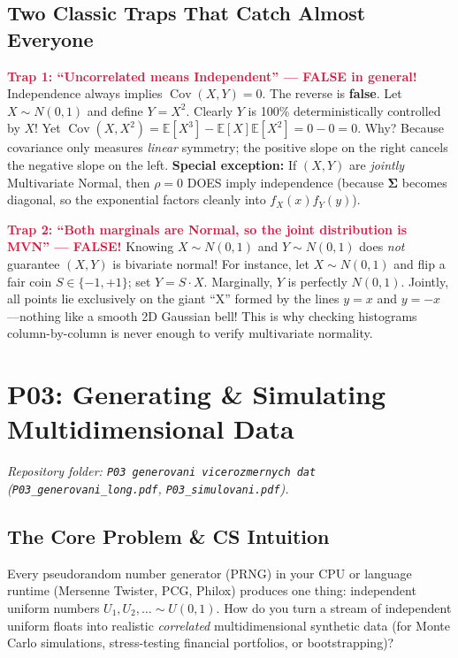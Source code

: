 \documentclass[11pt, a4paper]{article}
\begin{document}
\subsection{Two Classic Traps That Catch Almost Everyone}
\textcolor{crimson}{\textbf{Trap 1: ``Uncorrelated means Independent'' --- FALSE in general!}}
Independence always implies $\operatorname{Cov}(X, Y) = 0$. The reverse is \textbf{false}. Let $X \sim N(0,1)$ and define $Y = X^2$. Clearly $Y$ is 100\% deterministically controlled by $X$! Yet $\operatorname{Cov}(X, X^2) = \mathbb{E}[X^3] - \mathbb{E}[X]\mathbb{E}[X^2] = 0 - 0 = 0$. Why? Because covariance only measures \emph{linear} symmetry; the positive slope on the right cancels the negative slope on the left. \textbf{Special exception:} If $(X, Y)$ are \emph{jointly} Multivariate Normal, then $\rho = 0$ DOES imply independence (because $\boldsymbol{\Sigma}$ becomes diagonal, so the exponential factors cleanly into $f_X(x) f_Y(y)$).

\textcolor{crimson}{\textbf{Trap 2: ``Both marginals are Normal, so the joint distribution is MVN'' --- FALSE!}}
Knowing $X \sim N(0,1)$ and $Y \sim N(0,1)$ does \emph{not} guarantee $(X,Y)$ is bivariate normal! For instance, let $X \sim N(0,1)$ and flip a fair coin $S \in \{-1, +1\}$; set $Y = S \cdot X$. Marginally, $Y$ is perfectly $N(0,1)$. Jointly, all points lie exclusively on the giant ``X'' formed by the lines $y = x$ and $y = -x$---nothing like a smooth 2D Gaussian bell! This is why checking histograms column-by-column is never enough to verify multivariate normality.

\section{P03: Generating \& Simulating Multidimensional Data}
\emph{Repository folder: \texttt{P03 generovani vicerozmernych dat} (\texttt{P03\_generovani\_long.pdf}, \texttt{P03\_simulovani.pdf}).}

\subsection{The Core Problem \& CS Intuition}
Every pseudorandom number generator (PRNG) in your CPU or language runtime (Mersenne Twister, PCG, Philox) produces one thing: independent uniform numbers $U_1, U_2, \dots \sim U(0,1)$. How do you turn a stream of independent uniform floats into realistic \emph{correlated} multidimensional synthetic data (for Monte Carlo simulations, stress-testing financial portfolios, or bootstrapping)?
\end{document}
